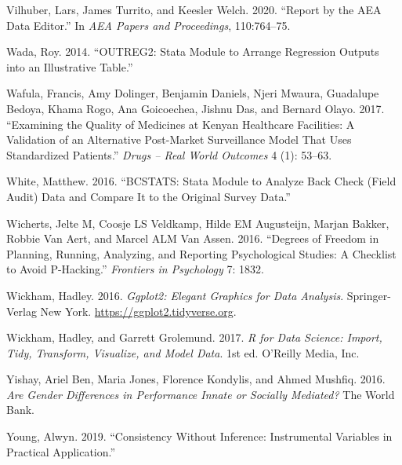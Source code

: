 \documentclass[
]{book}
\begin{document}
\leavevmode\hypertarget{ref-vilhuber2020report}{}%
Vilhuber, Lars, James Turrito, and Keesler Welch. 2020. ``Report by the AEA Data Editor.'' In \emph{AEA Papers and Proceedings}, 110:764--75.

\leavevmode\hypertarget{ref-wada2014outreg2}{}%
Wada, Roy. 2014. ``OUTREG2: Stata Module to Arrange Regression Outputs into an Illustrative Table.''

\leavevmode\hypertarget{ref-wafula2017examining}{}%
Wafula, Francis, Amy Dolinger, Benjamin Daniels, Njeri Mwaura, Guadalupe Bedoya, Khama Rogo, Ana Goicoechea, Jishnu Das, and Bernard Olayo. 2017. ``Examining the Quality of Medicines at Kenyan Healthcare Facilities: A Validation of an Alternative Post-Market Surveillance Model That Uses Standardized Patients.'' \emph{Drugs -- Real World Outcomes} 4 (1): 53--63.

\leavevmode\hypertarget{ref-white2016bcstats}{}%
White, Matthew. 2016. ``BCSTATS: Stata Module to Analyze Back Check (Field Audit) Data and Compare It to the Original Survey Data.''

\leavevmode\hypertarget{ref-wicherts2016degrees}{}%
Wicherts, Jelte M, Coosje LS Veldkamp, Hilde EM Augusteijn, Marjan Bakker, Robbie Van Aert, and Marcel ALM Van Assen. 2016. ``Degrees of Freedom in Planning, Running, Analyzing, and Reporting Psychological Studies: A Checklist to Avoid P-Hacking.'' \emph{Frontiers in Psychology} 7: 1832.

\leavevmode\hypertarget{ref-ggplot2}{}%
Wickham, Hadley. 2016. \emph{Ggplot2: Elegant Graphics for Data Analysis}. Springer-Verlag New York. \url{https://ggplot2.tidyverse.org}.

\leavevmode\hypertarget{ref-hadley2017R}{}%
Wickham, Hadley, and Garrett Grolemund. 2017. \emph{R for Data Science: Import, Tidy, Transform, Visualize, and Model Data}. 1st ed. O'Reilly Media, Inc.

\leavevmode\hypertarget{ref-yishay2016gender}{}%
Yishay, Ariel Ben, Maria Jones, Florence Kondylis, and Ahmed Mushfiq. 2016. \emph{Are Gender Differences in Performance Innate or Socially Mediated?} The World Bank.

\leavevmode\hypertarget{ref-young2017consistency}{}%
Young, Alwyn. 2019. ``Consistency Without Inference: Instrumental Variables in Practical Application.''
\end{document}

